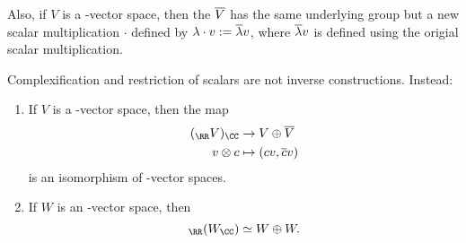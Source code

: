 \documentclass{scrartcl}
\begin{document}
Also, if $V$ is a \CC-vector space, then the  $\overline{V}$ has the same underlying group but a new scalar multiplication $\cdot$ defined by $\lambda\cdot v := \overline{\lambda}v$, where $\overline{\lambda}v$ is defined using the origial scalar multiplication.

Complexification and restriction of scalars are not inverse constructions. Instead:
\begin{proposition}
    \hfill
    \begin{enumerate}[font=\normalfont]
        \item If $V$ is a \CC-vector space, then the map \begin{align*}
            (_{\RR} V)_{\CC} &\rightarrow V \oplus \ol{V} \\
            v\otimes c &\mapsto (cv,\ol{c}v) \\
        \end{align*} is an isomorphism of \CC-vector spaces.
        \item If $W$ is an \RR-vector space, then \[_{\RR}(W_{\CC}) \simeq W\oplus W.\]
    \end{enumerate}
\end{proposition}
\end{document}
